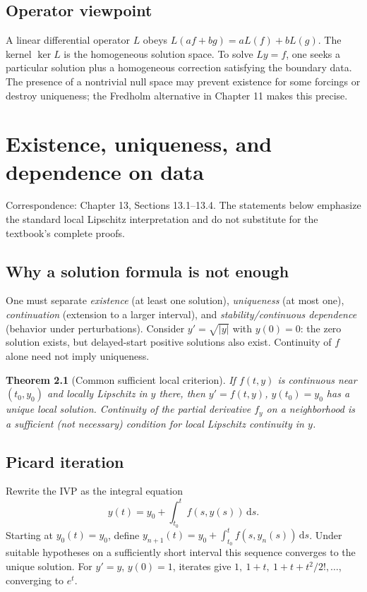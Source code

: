 \documentclass[11pt,letterpaper,oneside]{report}
\newtheorem{theorem}{Theorem}[chapter]
\theoremstyle{definition}\newtheorem{definition}[theorem]{Definition}
\theoremstyle{remark}\newtheorem{remark}[theorem]{Remark}
\newcommand{\dd}{\,\mathrm{d}}
\newcommand{\abs}[1]{\left\lvert#1\right\rvert}
\begin{document}
\section{Operator viewpoint}
A linear differential operator $L$ obeys $L(af+bg)=aL(f)+bL(g)$. The kernel $\ker L$ is the homogeneous solution space. To solve $Ly=f$, one seeks a particular solution plus a homogeneous correction satisfying the boundary data. The presence of a nontrivial null space may prevent existence for some forcings or destroy uniqueness; the Fredholm alternative in Chapter 11 makes this precise.
\chapter{Existence, uniqueness, and dependence on data}
\begin{bookground}Correspondence: Chapter 13, Sections 13.1--13.4. The statements below emphasize the standard local Lipschitz interpretation and do not substitute for the textbook's complete proofs.\end{bookground}
\section{Why a solution formula is not enough}
One must separate \emph{existence} (at least one solution), \emph{uniqueness} (at most one), \emph{continuation} (extension to a larger interval), and \emph{stability/continuous dependence} (behavior under perturbations). Consider $y'=\sqrt{\abs y}$ with $y(0)=0$: the zero solution exists, but delayed-start positive solutions also exist. Continuity of $f$ alone need not imply uniqueness.
\begin{theorem}[Common sufficient local criterion]
If $f(t,y)$ is continuous near $(t_0,y_0)$ and locally Lipschitz in $y$ there, then $y'=f(t,y)$, $y(t_0)=y_0$ has a unique local solution. Continuity of the partial derivative $f_y$ on a neighborhood is a sufficient (not necessary) condition for local Lipschitz continuity in $y$.
\end{theorem}
\section{Picard iteration}
Rewrite the IVP as the integral equation
\[y(t)=y_0+\int_{t_0}^{t}f(s,y(s))\dd s.\]
Starting at $y_0(t)=y_0$, define $y_{n+1}(t)=y_0+\int_{t_0}^{t}f(s,y_n(s))\dd s$. Under suitable hypotheses on a sufficiently short interval this sequence converges to the unique solution. For $y'=y$, $y(0)=1$, iterates give $1,\ 1+t,\ 1+t+t^2/2!,\ldots$, converging to $e^t$.
\end{document}
